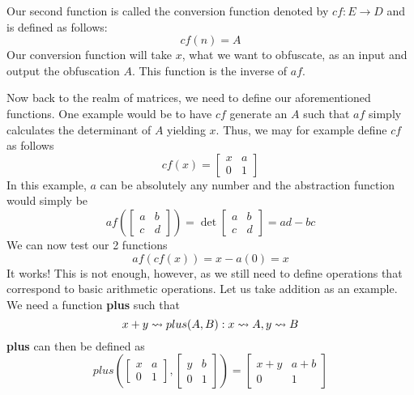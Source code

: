 Our second function is called the conversion function denoted by $ cf: E \to D
$ and is defined as follows:
\begin{equation*}
    cf (n) = A
\end{equation*}
Our conversion function will take $ x $, what we want to obfuscate, as an input
and output the obfuscation $ A $. This function is the inverse of $ af $.

Now back to the realm of matrices, we need to define our aforementioned
functions. One example would be to have $ cf $ generate an $ A $ such that $ af
$ simply calculates the determinant of $ A $ yielding $ x $. Thus, we may for
example define $ cf $ as follows
\begin{equation*}
    cf(x)
    =
    \begin{bmatrix}
        x & a \\
        0 & 1
    \end{bmatrix}
\end{equation*}
In this example, $ a $ can be absolutely any number and the abstraction
function would simply be
\begin{equation*}
    af \left(
    \begin{bmatrix}
        a & b \\
        c & d
    \end{bmatrix}
    \right)
    =
    \det
    \begin{bmatrix}
        a & b \\
        c & d
    \end{bmatrix}
    = ad - bc
\end{equation*}
We can now test our 2 functions
\begin{equation*}
    af(cf(x)) = x - a(0) = x
\end{equation*}
It works! This is not enough, however, as we still need to define operations
that correspond to basic arithmetic operations. Let us take addition as an
example. We need a function \textbf{plus} such that
\begin{equation*}
    x + y \rightsquigarrow \boldmath{plus(A, B)} : x \rightsquigarrow A, y
    \rightsquigarrow B
\end{equation*}
\textbf{plus} can then be defined as
\begin{equation*}
    plus\left(
    \begin{bmatrix}
        x & a \\
        0 & 1
    \end{bmatrix},
    \begin{bmatrix}
        y & b \\
        0 & 1
    \end{bmatrix}
    \right)
    =
    \begin{bmatrix}
        x + y & a + b \\
        0     & 1
    \end{bmatrix}
\end{equation*}
